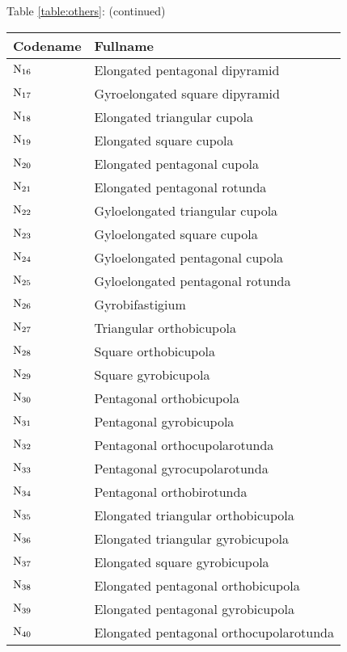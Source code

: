 \begin{table}[htbp]
\begin{center}
Table \ref{table:others}: (continued)

\vspace{4mm}
\begin{tabular}{l|l} \hline
Codename & Fullname \\ \hline
$\mbox{N$_{16}$}$ & Elongated pentagonal dipyramid \\
$\mbox{N$_{17}$}$ & Gyro\-elongated square dipyramid \\
$\mbox{N$_{18}$}$ & Elongated triangular cupola \\
$\mbox{N$_{19}$}$ & Elongated square cupola \\
$\mbox{N$_{20}$}$ & Elongated pentagonal cupola \\
$\mbox{N$_{21}$}$ & Elongated pentagonal rotunda \\
$\mbox{N$_{22}$}$ & Gylo\-elongated triangular cupola \\
$\mbox{N$_{23}$}$ & Gylo\-elongated square cupola \\
$\mbox{N$_{24}$}$ & Gylo\-elongated pentagonal cupola \\
$\mbox{N$_{25}$}$ & Gylo\-elongated pentagonal rotunda \\
$\mbox{N$_{26}$}$ & Gyrobifastigium \\
$\mbox{N$_{27}$}$ & Triangular ortho\-bi\-cupola \\
$\mbox{N$_{28}$}$ & Square ortho\-bi\-cupola \\
$\mbox{N$_{29}$}$ & Square gyro\-bi\-cupola \\
$\mbox{N$_{30}$}$ & Pentagonal ortho\-bi\-cupola \\
$\mbox{N$_{31}$}$ & Pentagonal gyro\-bi\-cupola \\
$\mbox{N$_{32}$}$ & Pentagonal ortho\-cupola\-rotunda \\
$\mbox{N$_{33}$}$ & Pentagonal gyro\-cupola\-rotunda \\
$\mbox{N$_{34}$}$ & Pentagonal ortho\-bi\-rotunda \\
$\mbox{N$_{35}$}$ & Elongated triangular ortho\-bi\-cupola \\
$\mbox{N$_{36}$}$ & Elongated triangular gyro\-bi\-cupola \\
$\mbox{N$_{37}$}$ & Elongated square gyro\-bi\-cupola \\
$\mbox{N$_{38}$}$ & Elongated pentagonal ortho\-bi\-cupola \\
$\mbox{N$_{39}$}$ & Elongated pentagonal gyro\-bi\-cupola \\
$\mbox{N$_{40}$}$ & Elongated pentagonal ortho\-cupola\-rotunda \\

\end{tabular}
\end{center}
\end{table}
